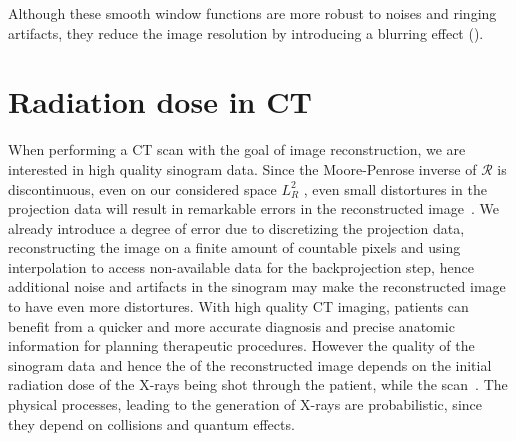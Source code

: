 \documentclass[12pt,a4paper]{article}
\begin{document}
Although these smooth window functions are more robust to noises and ringing artifacts,
they reduce the image resolution by introducing a blurring effect (\cite{DeepFBP_CT}).

\section{Radiation dose in CT}

When performing a CT scan with the goal of image reconstruction, we are interested in high quality sinogram data. Since the Moore-Penrose inverse of $\mathcal R$ is discontinuous, even on our considered space $L_R^2$ , even small distortures in the projection data will result in remarkable errors in the reconstructed image~\cite{math_of_ct_wald}. We already introduce a degree of error due to discretizing the projection data, reconstructing the image on a finite amount of countable pixels and using interpolation to access non-available data for the backprojection step, hence additional noise and artifacts in the sinogram may make the reconstructed image to have even more distortures. With high quality CT imaging, patients can benefit from a quicker and more accurate diagnosis and precise anatomic information for planning therapeutic procedures. However the quality of the sinogram data and hence the of the reconstructed image depends on the initial radiation dose of the X-rays being shot through the patient, while the scan~\cite{Solomon_Marin_Choudhury_Patel_Samei_2017}. The physical processes, leading to the generation of X-rays are probabilistic, since they depend on collisions and quantum effects. 
\newline\newline
\end{document}
